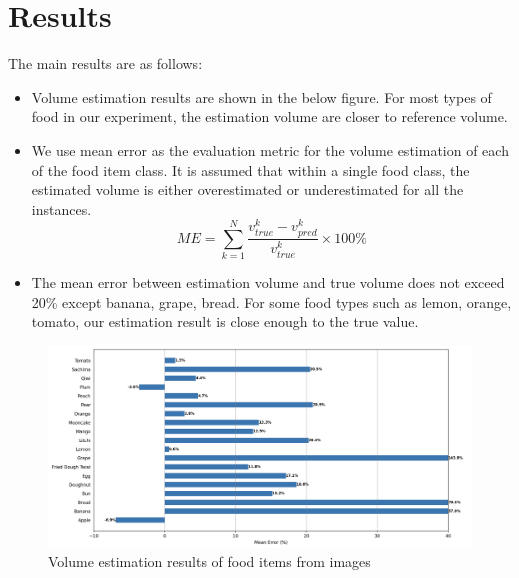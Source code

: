 \documentclass[12pt, a4paper, twoside]{article}
\begin{document}
	\section{Results}
	The main results are as follows:
		\begin{itemize}
		\item Volume estimation results are shown in the below figure. For most types of food in our experiment, the estimation volume are closer to reference volume.
		\item We use mean error as the evaluation metric for the volume estimation of each of the food item class. It is assumed that within a single food class, the estimated volume is either overestimated or underestimated for all the instances.
		\begin{equation}
			ME = \sum_{k=1}^{N} \frac{v_{true}^k-v_{pred}^k}{v_{true}^k}\times 100 \%
		\end{equation}
		\item The mean error between estimation volume and true volume does not exceed 20\% except banana, grape, bread. For some food types such as lemon, orange, tomato, our estimation result is close enough to the true value.
	\end{itemize}
	\begin{figure}[p]
		\centering
		\includegraphics[width=\textwidth]{vol_est.png}
		\caption{\scriptsize Volume estimation results of food items from images}
	\end{figure}
\end{document}
